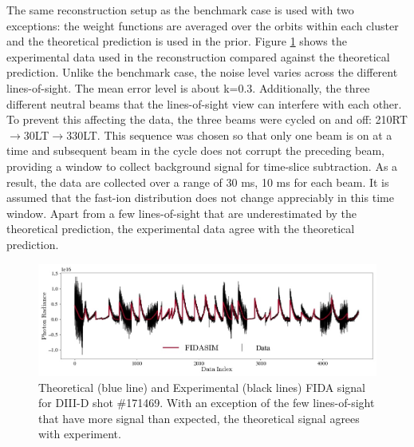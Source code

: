 The same reconstruction setup as the benchmark case is used with two exceptions: the weight functions are averaged over the orbits within each cluster and the theoretical prediction is used in the prior. 
Figure \ref{fig:d3d_data} shows the experimental data used in the reconstruction compared against the theoretical prediction. Unlike the benchmark case, the noise level varies across the different lines-of-sight. The mean error level is about k=0.3. Additionally, the three different neutral beams that the lines-of-sight view can interfere with each other. To prevent this affecting the data, the three beams were cycled on and off: 210RT$\rightarrow$30LT$\rightarrow$330LT. This sequence was chosen so that only one beam is on at a time and subsequent beam in the cycle does not corrupt the preceding beam, providing a window to collect background signal for time-slice subtraction. As a result, the data are collected over a range of 30 ms, 10 ms for each beam. It is assumed that the fast-ion distribution does not change appreciably in this time window. Apart from a few lines-of-sight that are underestimated by the theoretical prediction, the experimental data agree with the theoretical prediction.
\begin{figure}[h!]
    \centering
    \includegraphics[width=16cm]{figures/d3d_data.jpg}
    \caption{Theoretical (blue line) and Experimental (black lines) FIDA signal for DIII-D shot \#171469. With an exception of the few lines-of-sight that have more signal than expected, the theoretical signal agrees with experiment.}
    \label{fig:d3d_data}
\end{figure}

